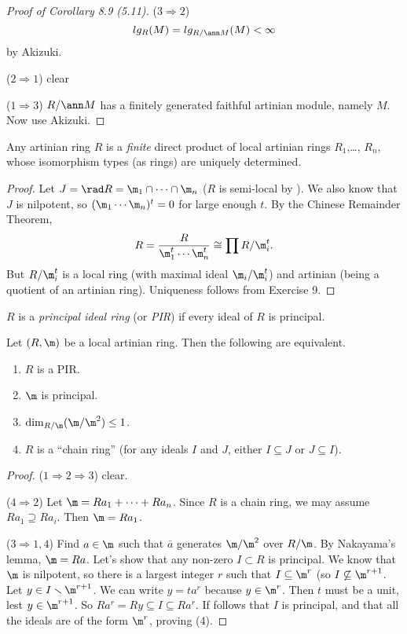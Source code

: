  \begin{proof}[Proof of Corollary 8.9 (5.11)]
   ($3\Rightarrow 2$)
   \[
    lg_R(M)=lg_{R/\ann M}(M) < \infty
   \]
   by Akizuki.

   ($2\Rightarrow 1$) clear

   ($1\Rightarrow 3$) $R/\ann M$ has a finitely generated faithful artinian module,
   namely $M$. Now use Akizuki.
 \end{proof}
 \begin{theorem}
   Any artinian ring $R$ is a \emph{finite} direct product of local artinian rings
   $R_1$,\dots, $R_n$, whose isomorphism types (as rings) are uniquely determined.
 \end{theorem}
 \begin{proof}
   Let $J=\rad R = \m_1\cap\cdots\cap \m_n$ ($R$ is semi-local by \anton{}). We also know
   that $J$ is nilpotent, so $(\m_1\cdots\m_n)^t=0$ for large enough $t$. By the Chinese
   Remainder Theorem,
   \[
     R=\frac{R}{\m_1^t\cdots \m_n^t} \cong \prod R/\m_i^t.
   \]
   But $R/\m_i^t$ is a local ring (with maximal ideal $\m_i/\m_i^t$) and artinian (being
   a quotient of an artinian ring). Uniqueness follows from Exercise 9.
 \end{proof}
 \begin{definition}
   $R$ is a \emph{principal ideal ring} (or \emph{PIR}) if every ideal of $R$ is
   principal.
 \end{definition}
 \begin{theorem}[5.13]
   Let $(R,\m)$ be a local artinian ring. Then the following are equivalent.
   \begin{enumerate}
     \item $R$ is a PIR.
     \item $\m$ is principal.
     \item $\dim_{R/\m}(\m/\m^2)\le 1$.
     \item $R$ is a ``chain ring'' (for any ideals $I$ and $J$, either $I\subseteq J$ or
     $J\subseteq I$).
   \end{enumerate}
 \end{theorem}
 \begin{proof}
   ($1\Rightarrow 2\Rightarrow 3$) clear.

   ($4\Rightarrow 2$) Let $\m=Ra_1+\cdots + Ra_n$. Since $R$ is a chain ring, we may
   assume $Ra_1\supseteq Ra_i$. Then $\m = Ra_1$.

   ($3\Rightarrow 1,4$) Find $a\in \m$ such that $\bar a$ generates $\m/\m^2$ over
   $R/\m$. By Nakayama's lemma, $\m = Ra$. Let's show that any non-zero $I\subset R$ is
   principal. We know that $\m$ is nilpotent, so there is a largest integer $r$ such that
   $I\subseteq \m^r$ (so $I\not\subseteq \m^{r+1}$. Let $y\in I\smallsetminus \m^{r+1}$.
   We can write $y=ta^r$ because $y\in \m^r$. Then $t$ must be a unit, lest $y\in
   \m^{r+1}$. So $Ra^r=Ry\subseteq I\subseteq Ra^r$. If follows that $I$ is principal,
   and that all the ideals are of the form $\m^r$, proving (4).
 \end{proof}
